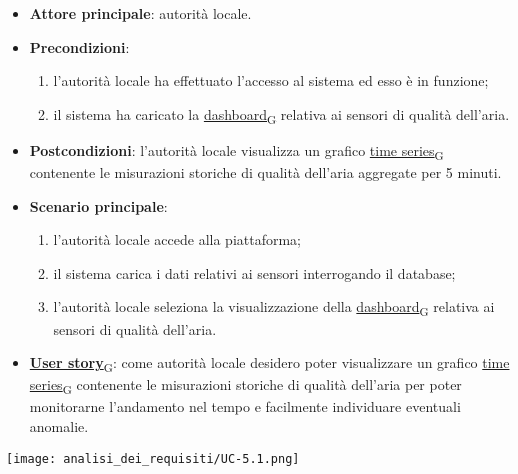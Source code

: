 \newpage

\begin{itemize}
	\item \textbf{Attore principale}: autorità locale.
	\item \textbf{Precondizioni}:
	      \begin{enumerate}
		      \item l'autorità locale ha effettuato l'accesso al sistema ed esso è in funzione;
		      \item il sistema ha caricato la \href{https://7last.github.io/docs/rtb/documentazione-interna/glossario\#dashboard}{dashboard\textsubscript{G}} relativa ai sensori di qualità dell'aria.
	      \end{enumerate}
	\item \textbf{Postcondizioni}: l'autorità locale visualizza un grafico \href{https://7last.github.io/docs/rtb/documentazione-interna/glossario\#time-series}{time series\textsubscript{G}} contenente le misurazioni storiche
	      di qualità dell'aria aggregate per 5 minuti.
	\item \textbf{Scenario principale}:
	      \begin{enumerate}
		      \item l'autorità locale accede alla piattaforma;
		      \item il sistema carica i dati relativi ai sensori interrogando il database;
		      \item l'autorità locale seleziona la visualizzazione della \href{https://7last.github.io/docs/rtb/documentazione-interna/glossario\#dashboard}{dashboard\textsubscript{G}} relativa ai sensori di qualità dell'aria.
	      \end{enumerate}
	\item \href{https://7last.github.io/docs/rtb/documentazione-interna/glossario\#user-story}{\textbf{User story}\textsubscript{G}}:
	      come autorità locale desidero poter visualizzare un grafico \href{https://7last.github.io/docs/rtb/documentazione-interna/glossario\#time-series}{time series\textsubscript{G}} contenente le misurazioni storiche
	      di qualità dell'aria per poter monitorarne l'andamento nel tempo e facilmente individuare eventuali anomalie.
\end{itemize}
\begin{center}
	\texttt{[image: analisi\_dei\_requisiti/UC-5.1.png]}
\end{center}

